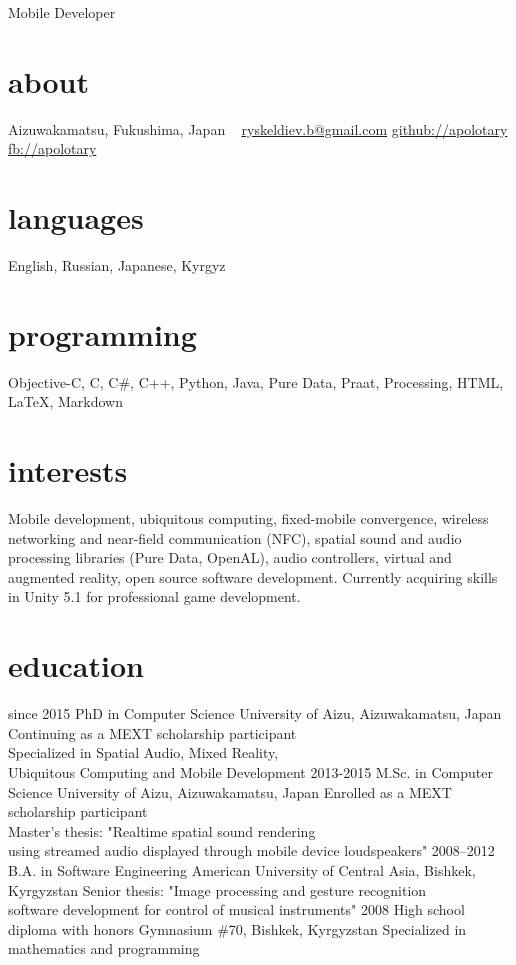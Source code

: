 \documentclass[]{friggeri-cv}
\begin{document}
       {Mobile Developer}

\begin{aside}
  \section{about}
    Aizuwakamatsu,
    Fukushima, Japan
    ~
    \href{mailto:ryskeldiev.b@gmail.com}{ryskeldiev.b@gmail.com}
    \href{https://github.com/Apolotary/}{github://apolotary}
    \href{http://facebook.com/apolotary}{fb://apolotary}
  \section{languages}
	English, Russian,
	Japanese, Kyrgyz
  \section{programming}
	Objective-C, C, C\#,
	C++, Python, Java,
	Pure Data, Praat,
	Processing,
	HTML, LaTeX,
	Markdown
 \end{aside}

\section{interests}

Mobile development, ubiquitous computing, fixed-mobile convergence, wireless networking and near-field communication (NFC), spatial sound and audio processing libraries (Pure Data, OpenAL), audio controllers, virtual and augmented reality, open source software development. Currently acquiring skills in Unity 5.1 for professional game development.
\section{education}

\begin{entrylist}
  \entry
    {since 2015}
    {PhD in Computer Science}
    {University of Aizu, Aizuwakamatsu, Japan}
    {Continuing as a MEXT scholarship participant\\
    Specialized in Spatial Audio, Mixed Reality,\\
    Ubiquitous Computing and Mobile Development}
  \entry
    {2013-2015}
    {M.Sc. in Computer Science}
    {University of Aizu, Aizuwakamatsu, Japan}
    {Enrolled as a MEXT scholarship participant\\
    Master's thesis: "Realtime spatial sound rendering\\
     using streamed audio displayed through mobile device loudspeakers"}
  \entry
    {2008–2012}
    {B.A. in Software Engineering}
    {American University of Central Asia, Bishkek, Kyrgyzstan}
    {Senior thesis: "Image processing and gesture recognition\\
     software development for control of musical instruments"}
  \entry
    {2008}
    {High school diploma with honors}
    {Gymnasium \#70, Bishkek, Kyrgyzstan}
    {Specialized in mathematics and programming}
\end{entrylist}
\end{document}
